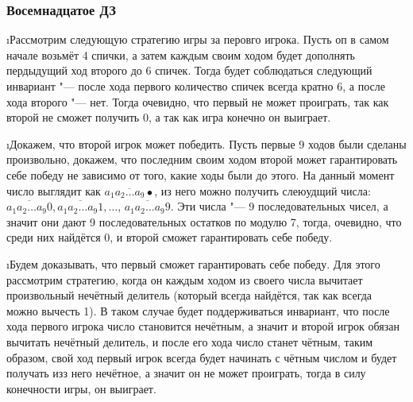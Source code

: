 \subsubsection{Восемнадцатое ДЗ}


\i Рассмотрим следующую стратегию игры за перовго игрока. Пусть оп в самом начале возьмёт 4 спички, а затем каждым своим ходом будет дополнять пердыдущий ход второго до 6 спичек. Тогда будет соблюдаться следующий инвариант "--- после хода первого количество спичек всегда кратно 6, а после хода второго "--- нет. Тогда очевидно, что первый не может проиграть, так как второй не сможет получить 0, а так как игра конечно он выиграет.

\i Докажем, что второй игрок может победить. Пусть первые 9 ходов были сделаны произвольно, докажем, что последним своим ходом второй может гарантировать себе победу не зависимо от того, какие ходы были до этого. На данный момент число выглядит как $\overline{a_1a_2\ldots a_9\bullet}$, из него можно получить слеюудщий числа: $\overline{a_1a_2\ldots a_9 0}, \overline{a_1a_2\ldots a_9 1}, \ldots$, $\overline{a_1a_2\ldots a_9 9}$. Эти числа "--- 9 последовательных чисел, а значит они дают 9 последовательных остатков по модулю 7, тогда, очевидно, что среди них найдётся 0, и второй сможет гарантировать себе победу.

\i Будем доказывать, что первый сможет гарантировать себе победу. Для этого рассмотрим стратегию, когда он каждым ходом из своего числа вычитает произвольный нечётный делитель (который всегда найдётся,  так как всегда можно вычесть 1). В таком случае будет поддерживаться инвариант, что после хода первого игрока число становится нечётным, а значит и второй игрок обязан вычитать нечётный делитель, и после его хода число станет чётным, таким образом, свой ход первый игрок всегда будет начинать с чётным числом и будет получать изз него нечётное, а значит он не может проиграть, тогда в силу конечности игры, он выиграет.


